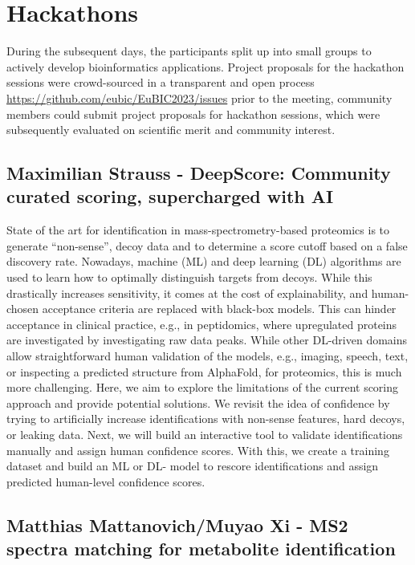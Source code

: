 \section{Hackathons}

During the subsequent days, the participants split up into small groups to actively develop bioinformatics applications. Project proposals for the hackathon sessions were crowd-sourced in a transparent and open process \url{https://github.com/eubic/EuBIC2023/issues} prior to the meeting, community members could submit project proposals for hackathon sessions, which were subsequently evaluated on scientific merit and community interest.


\subsection{Maximilian Strauss - DeepScore: Community curated scoring, supercharged with AI}

State of the art for identification in mass-spectrometry-based proteomics is to generate “non-sense”, decoy data and to determine a score cutoff based on a false discovery rate. Nowadays, machine (ML) and deep learning (DL) algorithms are used to learn how to optimally distinguish targets from decoys. While this drastically increases sensitivity, it comes at the cost of explainability, and human-chosen acceptance criteria are replaced with black-box models. This can hinder acceptance in clinical practice, e.g., in peptidomics, where upregulated proteins are investigated by investigating raw data peaks. While other DL-driven domains allow straightforward human validation of the models, e.g., imaging, speech, text, or inspecting a predicted structure from AlphaFold, for proteomics, this is much more challenging. Here, we aim to explore the limitations of the current scoring approach and provide potential solutions. We revisit the idea of confidence by trying to artificially increase identifications with non-sense features, hard decoys, or leaking data. Next, we will build an interactive tool to validate identifications manually and assign human confidence scores. With this, we create a training dataset and build an ML or DL- model to rescore identifications and assign predicted human-level confidence scores.\\


\subsection{Matthias Mattanovich/Muyao Xi - MS2 spectra matching for metabolite identification}

